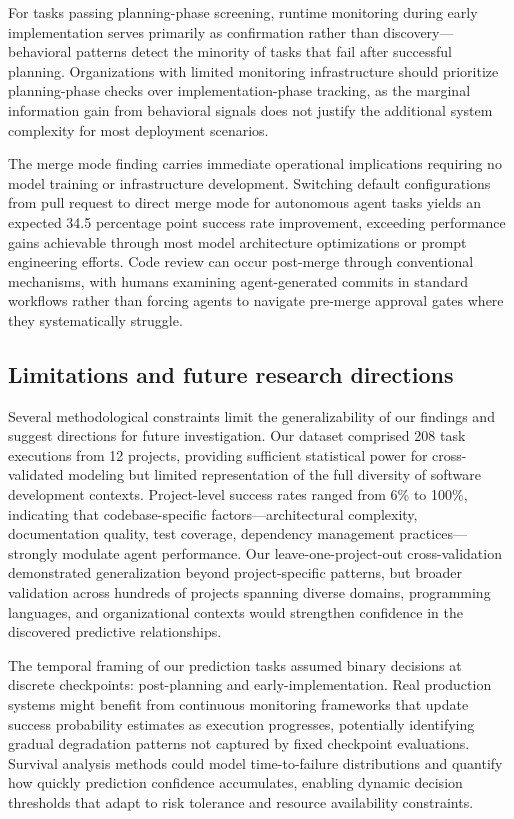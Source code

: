 \documentclass[]{article}
\begin{document}
For tasks passing planning-phase screening, runtime monitoring during early implementation serves primarily as confirmation rather than discovery—behavioral patterns detect the minority of tasks that fail after successful planning. Organizations with limited monitoring infrastructure should prioritize planning-phase checks over implementation-phase tracking, as the marginal information gain from behavioral signals does not justify the additional system complexity for most deployment scenarios.

The merge mode finding carries immediate operational implications requiring no model training or infrastructure development. Switching default configurations from pull request to direct merge mode for autonomous agent tasks yields an expected 34.5 percentage point success rate improvement, exceeding performance gains achievable through most model architecture optimizations or prompt engineering efforts. Code review can occur post-merge through conventional mechanisms, with humans examining agent-generated commits in standard workflows rather than forcing agents to navigate pre-merge approval gates where they systematically struggle.

\subsection{Limitations and future research directions}

Several methodological constraints limit the generalizability of our findings and suggest directions for future investigation. Our dataset comprised 208 task executions from 12 projects, providing sufficient statistical power for cross-validated modeling but limited representation of the full diversity of software development contexts. Project-level success rates ranged from 6\% to 100\%, indicating that codebase-specific factors—architectural complexity, documentation quality, test coverage, dependency management practices—strongly modulate agent performance. Our leave-one-project-out cross-validation demonstrated generalization beyond project-specific patterns, but broader validation across hundreds of projects spanning diverse domains, programming languages, and organizational contexts would strengthen confidence in the discovered predictive relationships.

The temporal framing of our prediction tasks assumed binary decisions at discrete checkpoints: post-planning and early-implementation. Real production systems might benefit from continuous monitoring frameworks that update success probability estimates as execution progresses, potentially identifying gradual degradation patterns not captured by fixed checkpoint evaluations. Survival analysis methods could model time-to-failure distributions and quantify how quickly prediction confidence accumulates, enabling dynamic decision thresholds that adapt to risk tolerance and resource availability constraints.
\end{document}
